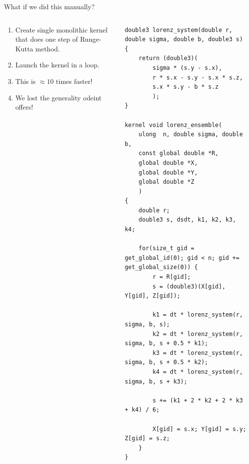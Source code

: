\documentclass[@BEAMER_OPTIONS@]{beamer}
\begin{document}
\begin{frame}[fragile,shrink=40]{What if we did this manually?}
    \begin{columns}
        \begin{column}{0.45\textwidth}
            \begin{LARGE}
                \begin{enumerate}
                    \item Create single monolithic kernel that does one step of
                        Runge-Kutta method.
                    \item Launch the kernel in a loop.
                        \vspace{2\baselineskip}
                    \item This is $\approx 10$ times faster!
                    \item<3|alert@3> We lost the generality odeint offers!
                \end{enumerate}
            \end{LARGE}
        \end{column} \quad \quad
        \begin{column}{0.5\textwidth}
            \begin{exampleblock}{}
                \begin{lstlisting}
double3 lorenz_system(double r, double sigma, double b, double3 s) {
    return (double3)(
        sigma * (s.y - s.x),
        r * s.x - s.y - s.x * s.z,
        s.x * s.y - b * s.z
        );
}

kernel void lorenz_ensemble(
    ulong  n, double sigma, double b,
    const global double *R,
    global double *X,
    global double *Y,
    global double *Z
    )
{
    double r;
    double3 s, dsdt, k1, k2, k3, k4;

    for(size_t gid = get_global_id(0); gid < n; gid += get_global_size(0)) {
        r = R[gid];
        s = (double3)(X[gid], Y[gid], Z[gid]);

        k1 = dt * lorenz_system(r, sigma, b, s);
        k2 = dt * lorenz_system(r, sigma, b, s + 0.5 * k1);
        k3 = dt * lorenz_system(r, sigma, b, s + 0.5 * k2);
        k4 = dt * lorenz_system(r, sigma, b, s + k3);

        s += (k1 + 2 * k2 + 2 * k3 + k4) / 6;

        X[gid] = s.x; Y[gid] = s.y; Z[gid] = s.z;
    }
}
                \end{lstlisting}
            \end{exampleblock}
        \end{column}
    \end{columns}
\end{frame}
\end{document}
